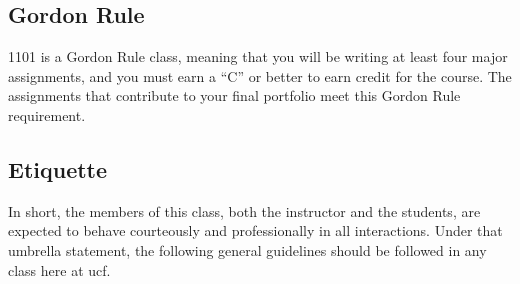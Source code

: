\documentclass[11pt, twosides]{amsart}	%
\begin{document}
\subsection{Gordon Rule} %
\label{sub:gordon_rule}
\ac{1101} is a Gordon Rule class, meaning that you will be writing at least four major assignments, and you must earn a ``C'' or better to earn credit for the course. The assignments that contribute to your final portfolio meet this Gordon Rule requirement.



\subsection{Etiquette}
In short, the members of this class, both the instructor and the students, are expected to behave courteously and professionally in all interactions.  Under that umbrella statement, the following general guidelines should be followed in any class here at \ac{ucf}.
\end{document}
